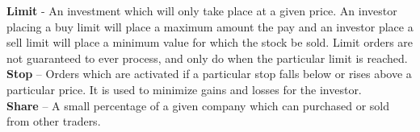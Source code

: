 {\textbf{Limit} - An investment which will only take place at a given price. An
investor placing a buy limit will place a maximum amount the pay and an investor
place a sell limit will place a minimum value for which the stock be sold. Limit
orders are not guaranteed to ever process, and only do when the particular limit
is reached.\cite{inv:limit}\\

\textbf{Stop} -- Orders which are activated if a particular stop falls below or
rises above a particular price. It is used to minimize gains and losses for the
investor.\cite{inv:stop}\\

\textbf{Share} -- A small percentage of a given company which can purchased or
sold from other traders.\\
}
